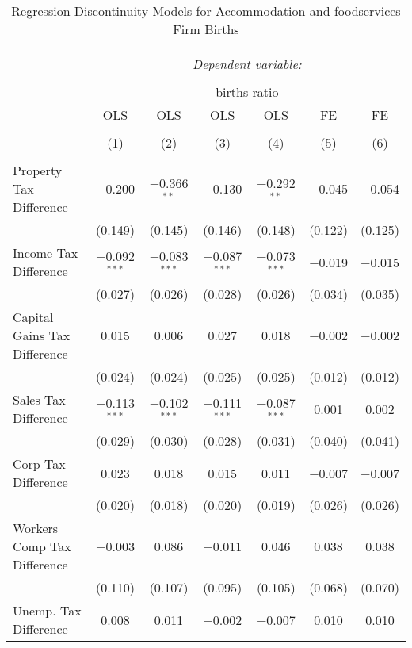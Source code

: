 
\begin{table}[!htbp] \centering 
  \caption{Regression Discontinuity Models for  Accommodation and foodservices Firm Births} 
  \label{72rd} 
\begin{tabular}{@{\extracolsep{5pt}}lcccccc} 
\\[-1.8ex]\hline 
\hline \\[-1.8ex] 
 & \multicolumn{6}{c}{\textit{Dependent variable:}} \\ 
\cline{2-7} 
\\[-1.8ex] & \multicolumn{6}{c}{births ratio} \\ 
 & OLS & OLS & OLS & OLS & FE & FE \\ 
\\[-1.8ex] & (1) & (2) & (3) & (4) & (5) & (6)\\ 
\hline \\[-1.8ex] 
 Property Tax Difference & $-$0.200 & $-$0.366$^{**}$ & $-$0.130 & $-$0.292$^{**}$ & $-$0.045 & $-$0.054 \\ 
  & (0.149) & (0.145) & (0.146) & (0.148) & (0.122) & (0.125) \\ 
  Income Tax Difference & $-$0.092$^{***}$ & $-$0.083$^{***}$ & $-$0.087$^{***}$ & $-$0.073$^{***}$ & $-$0.019 & $-$0.015 \\ 
  & (0.027) & (0.026) & (0.028) & (0.026) & (0.034) & (0.035) \\ 
  Capital Gains Tax Difference & 0.015 & 0.006 & 0.027 & 0.018 & $-$0.002 & $-$0.002 \\ 
  & (0.024) & (0.024) & (0.025) & (0.025) & (0.012) & (0.012) \\ 
  Sales Tax Difference & $-$0.113$^{***}$ & $-$0.102$^{***}$ & $-$0.111$^{***}$ & $-$0.087$^{***}$ & 0.001 & 0.002 \\ 
  & (0.029) & (0.030) & (0.028) & (0.031) & (0.040) & (0.041) \\ 
  Corp Tax Difference & 0.023 & 0.018 & 0.015 & 0.011 & $-$0.007 & $-$0.007 \\ 
  & (0.020) & (0.018) & (0.020) & (0.019) & (0.026) & (0.026) \\ 
  Workers Comp Tax Difference & $-$0.003 & 0.086 & $-$0.011 & 0.046 & 0.038 & 0.038 \\ 
  & (0.110) & (0.107) & (0.095) & (0.105) & (0.068) & (0.070) \\ 
  Unemp. Tax Difference & 0.008 & 0.011 & $-$0.002 & $-$0.007 & 0.010 & 0.010 \\ 

\end{tabular}
\end{table}

